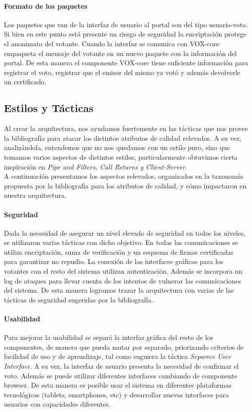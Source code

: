 \paragraph{Formato de los paquetes} Los paquetes que van de la interfaz de usuario al portal son del tipo usuario-voto. Si bien en este punto está presente un riesgo de seguridad la encriptación protege el anonimato del votante. Cuando la interfaz se comunica con VOX-core empaqueta el mensaje del votante en un nuevo paquete con la información del portal. De esta manera el componente VOX-core tiene suficiente información para registrar el voto, registrar que el emisor del mismo ya votó y además devolverle un certificado.

\subsection{Estilos y Tácticas}

Al crear la arquitectura, nos ayudamos fuertemente en las tácticas que nos provee la bibliografía para atacar los distintos atributos de calidad relevados. A su vez, analizándola, entendemos que no nos quedamos con un estilo puro, sino que tomamos varios aspectos de distintos estilos, particularmente obtuvimos cierta inspiración en \textit{Pipe and Filters, Call Returns y Client-Server}. \\ A continuación presentamos los aspectos relevados, organizados en la taxonomía propuesta por la bibliografía para los atributos de calidad, y cómo impactaron en nuestra arquitectura.
 

\paragraph{Seguridad}
Dada la necesidad de asegurar un nivel elevado de seguridad en todos los niveles, se utilizaron varias tácticas con dicho objetivo. En todas las comunicaciones se utiliza encriptación, suma de verificación y un esquema de firmas certificadas para garantizar no repudio. La conexión de las interfaces gráficas para los votantes con el resto del sistema utilizan autenticación. Además se incorpora un log de ataques para llevar cuenta de los intentos de vulnerar las comunicaciones del sistema. De esta manera logramos trazar la arquitectura con varias de las tácticas de seguridad sugeridas por la bibliografía.

\paragraph{Usabilidad}
Para mejorar la usabilidad se separó la interfaz gráfica del resto de los componentes, de manera que pueda mutar por separado, priorizando criterios de facilidad de uso y de aprendizaje, tal como suguiera la táctica \textit{Separece User Interface}. A su vez, la interfaz de usuario presenta la necesidad de confirmar el voto. Además se puede utilizar diferentes interfaces cambiando de componente browser. De esta manera es posible usar el sistema en diferentes plataformas tecnológicas (tablets, smartphones, etc) y desarrollar nuevas interfaces para usuarios con capacidades diferentes.

